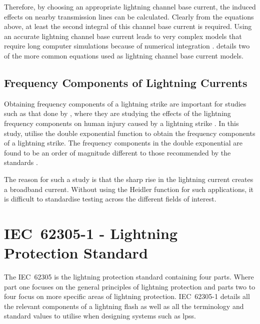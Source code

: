 Therefore, by choosing an appropriate lightning channel base current, the induced effects on nearby transmission lines can be calculated. Clearly from the equations above, at least the second integral of this channel base current is required. Using an accurate lightning channel base current leads to very complex models that require long computer simulations because of numerical integration \cite{Paolone2009}.  details two of the more common equations used as lightning channel base current models.

\subsection{Frequency Components of Lightning Currents}
\label{sub:background_frequency_components_of_lightning_currents}
Obtaining frequency components of a lightning strike are important for studies such as that done by \citeauthor{Lee2014}, where they are studying the effects of the lightning frequency components on human injury caused by a lightning strike \cite{Lee2014}. In this study, \citeauthor{Lee2014} utilise the double exponential function to obtain the frequency components of a lightning strike. The frequency components in the double exponential are found to be an order of magnitude different to those recommended by the standards \cite{1422588}.

The reason for such a study is that the sharp rise in the lightning current creates a broadband current. Without using the Heidler function for such applications, it is difficult to standardise testing across the different fields of interest.


\section{IEC~62305-1 - Lightning Protection Standard}
\label{sec:background_iec62305}
The IEC~62305 is the lightning protection standard containing four parts. Where part one focuses on the general principles of lightning protection and parts two to four focus on more specific areas of lightning protection. IEC~62305-1 details all the relevant components of a lightning flash as well as all the terminology and standard values to utilise when designing systems such as \glspl{lps}.

